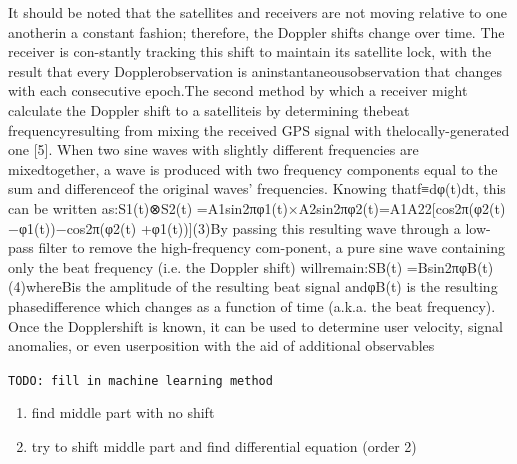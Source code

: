 It should be noted that the satellites and receivers are not moving relative to one anotherin a constant fashion; therefore, the Doppler shifts change over time.  The receiver is con-stantly tracking this shift to maintain its satellite lock, with the result that every Dopplerobservation is aninstantaneousobservation that changes with each consecutive epoch.The second method by which a receiver might calculate the Doppler shift to a satelliteis by determining thebeat frequencyresulting from mixing the received GPS signal with thelocally-generated one [5].  When two sine waves with slightly different frequencies are mixedtogether, a wave is produced with two frequency components equal to the sum and differenceof the original waves’ frequencies.  Knowing thatf≡dφ(t)dt, this can be written as:S1(t)⊗S2(t) =A1sin2πφ1(t)×A2sin2πφ2(t)=A1A22[cos2π(φ2(t)−φ1(t))−cos2π(φ2(t) +φ1(t))](3)By passing this resulting wave through a low-pass filter to remove the high-frequency com-ponent,  a  pure  sine  wave  containing  only  the  beat  frequency  (i.e.   the  Doppler  shift)  willremain:SB(t) =Bsin2πφB(t)(4)whereBis  the  amplitude  of  the  resulting  beat  signal  andφB(t)  is  the  resulting  phasedifference which changes as a function of time (a.k.a.  the beat frequency).  Once the Dopplershift  is  known,  it  can  be  used  to  determine  user  velocity,  signal  anomalies,  or  even  userposition with the aid of additional observables

\texttt{TODO: fill in machine learning method}

\begin{enumerate}
	\item find middle part with no shift
	\item try to shift middle part and find differential equation (order 2)
\end{enumerate}
 